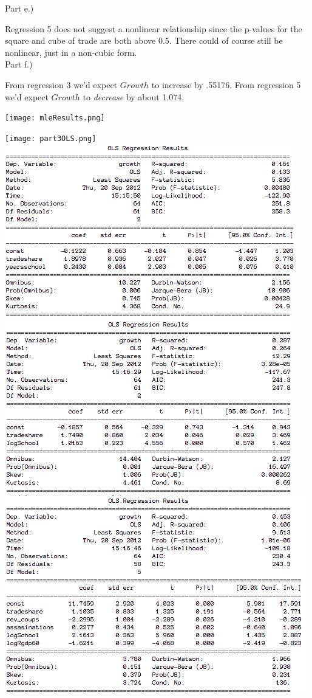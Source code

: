 \documentclass[11pt]{article}
\begin{document}
Part e.)

Regression 5 does not suggest a nonlinear relationship since the p-values for the square and cube of trade are both above 0.5.  There could of course still be nonlinear, just in a non-cubic form.
\\

Part f.)

From regression 3 we'd expect $Growth$ to increase by .55176.  From regression 5 we'd expect $Growth$ to \emph{decrease} by about 1.074.

\texttt{[image: mleResults.png]}

\texttt{[image: part3OLS.png]}
\includegraphics[scale = .5]{summary1.png}
\includegraphics[scale = .5]{summary2.png}
\includegraphics[scale = .5]{summary3.png}
\end{document}
